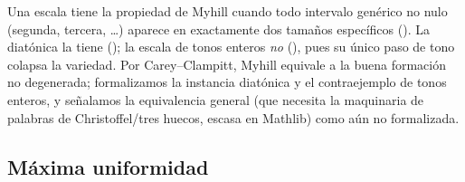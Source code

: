 
Una escala tiene la propiedad de Myhill cuando todo intervalo genérico no nulo (segunda, tercera, \dots)
aparece en exactamente dos tamaños específicos (). La diatónica la tiene
(); la escala de tonos enteros \emph{no} (), pues
su único paso de tono colapsa la variedad. Por Carey--Clampitt, Myhill equivale a la buena formación no
degenerada; formalizamos la instancia diatónica y el contraejemplo de tonos enteros, y señalamos la
equivalencia general (que necesita la maquinaria de palabras de Christoffel/tres huecos, escasa en Mathlib)
como aún no formalizada.

\subsection{Máxima uniformidad}\label{sec:p3-me}


